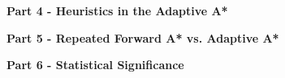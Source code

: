\documentclass[11pt]{article}
\begin{document}
    \begin{center}
        \Large
        \textbf{Part 4 - Heuristics in the Adaptive A*}
    \end{center}
    
    
    \begin{center}
        \Large
        \textbf{Part 5 - Repeated Forward A* vs. Adaptive A*}
    \end{center}
    
    
    \begin{center}
        \Large
        \textbf{Part 6 - Statistical Significance}
    \end{center}
    
    
\end{document}
